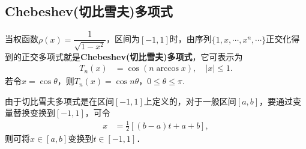 \documentclass[../../main.tex]{subfiles}%
\begin{document}
\subsection{Chebeshev(切比雪夫)多项式}

\begin{definition}
当权函数$\rho(x) = \dfrac{1}{\sqrt{1 - x^2}}$，区间为$[-1,1]$时，由序列$\{1,x,\cdots,x^n,\cdots\}$正交化得到的正交多项式就是\textbf{Chebeshev(切比雪夫)多项式}，它可表示为
\begin{align}\label{eq:数值分析-3-2.10}
T_n(x) &= \cos(n \arccos x),\quad |x| \leqslant 1.
\end{align}
若令$x = \cos\theta$，则$T_n(x) = \cos n\theta$，$0 \leqslant \theta \leqslant \pi$.
\end{definition}
\begin{remark}
由于切比雪夫多项式是在区间$[-1,1]$上定义的，对于一般区间$[a,b]$，要通过变量替换变换到$[-1,1]$，可令
\begin{align}\label{eq:数值分析-3-2.14}
x &= \frac{1}{2}[(b - a)t + a + b],
\end{align}
则可将$x \in [a,b]$变换到$t \in [-1,1]$．
\end{remark}
\end{document}
